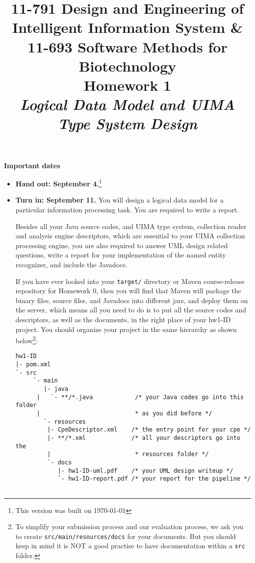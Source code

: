\documentclass[oneside]{memoir}
\title{{\bfseries 11-791 Design and Engineering of Intelligent Information
System \& \\11-693 Software Methods for Biotechnology \\Homework 1}\\
\vspace{1em}
\itshape\rmfamily Logical Data Model and UIMA Type System Design}
\date{}
\begin{document}
\begin{titlingpage}
\maketitle

\hspace{-0.1\textwidth}
\begin{minipage}{1.2\textwidth}
\vspace{-5em}
\textbf{Important dates}
\begin{itemize}

\item \textbf{Hand out: September 4.}\footnote{This version was built on \today}

\item \textbf{Turn in: September 11.} You will design a logical data model for a
particular information processing task. You are required to write a report.

Besides all your Java source codes, and
UIMA type system, collection reader and analysis engine descriptors, which are
essential to your UIMA collection processing engine, you are also required to
answer UML design related questions, write a report for your implementation of
the named entity recognizer, and include the Javadocs.

If you have ever looked into your \verb|target/| directory or Maven
course-release repository for Homework 0, then you will find that Maven will
package the binary files, source files, and Javadocs into different jars, and
deploy them on the server, which means all you need to do is to put all the
source codes and descriptors, as well as the documents, in the right place of
your hw1-ID project. You should organize your project in the same hierarchy as
shown below\footnote{To simplify your submission process and our evaluation
process, we ask you to create \texttt{src/main/resources/docs} for your
documents. But you should keep in mind it is NOT a good practise to have
documentation within a \texttt{src} folder.}:

\small
\begin{verbatim}
hw1-ID
|- pom.xml
`- src
     `- main
        |- java
      |   `- **/*.java            /* your Java codes go into this folder 
      |                           * as you did before */
        `- resources
         |- CpeDescriptor.xml    /* the entry point for your cpe */
         |- **/*.xml             /* all your descriptors go into the 
         |                        * resources folder */
         `- docs
            |- hw1-ID-uml.pdf    /* your UML design writeup */
            `- hw1-ID-report.pdf /* your report for the pipeline */


\end{verbatim}
\end{itemize}
\end{minipage}
\end{titlingpage}
\end{document}
